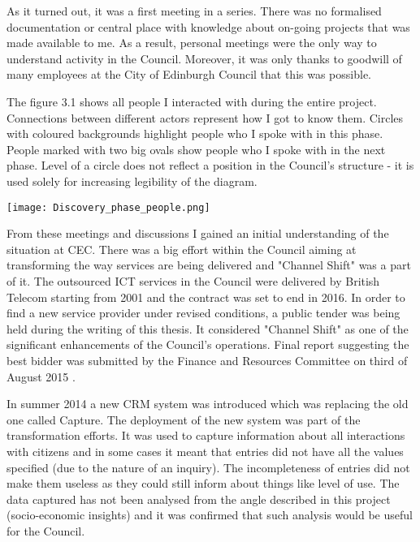 As it turned out, it was a first meeting in a series. There was no formalised documentation or central place with knowledge about on-going projects that was made available to me. As a result, personal meetings were the only way to understand activity in the Council. Moreover, it was only thanks to goodwill of many employees at the City of Edinburgh Council that this was possible.

The figure 3.1 shows all people I interacted with during the entire project. Connections between different actors represent how I got to know them. Circles with coloured backgrounds highlight people who I spoke with in this phase. People marked with two big ovals show people who I spoke with in the next phase. Level of a circle does not reflect a position in the Council's structure - it is used solely for increasing legibility of the diagram.

\begin{center}
  \texttt{[image: Discovery\_phase\_people.png]}
\end{center}


From these meetings and discussions I gained an initial understanding of the situation at CEC. There was a big effort within the Council aiming at transforming the way services are being delivered and "Channel Shift" was a part of it. The outsourced ICT services in the Council were delivered by British Telecom starting from 2001 and the contract was set to end in 2016. In order to find a new service provider under revised conditions, a public tender was being held during the writing of this thesis. It considered "Channel Shift" as one of the significant enhancements of the Council's operations. Final report suggesting the best bidder was submitted by the Finance and Resources Committee on third of August 2015 \citep{FinanceandResourcesCommittee2016}.

In summer 2014 a new CRM system was introduced which was replacing the old one called Capture. The deployment of the new system was part of the transformation efforts. It was used to capture information about all interactions with citizens and in some cases it meant that entries did not have all the values specified (due to the nature of an inquiry). The incompleteness of entries did not make them useless as they could still inform about things like level of use. The data captured has not been analysed from the angle described in this project (socio-economic insights) and it was confirmed that such analysis would be useful for the Council.

